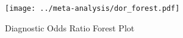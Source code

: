 \begin{figure}[p]


\texttt{[image: ../meta-analysis/dor\_forest.pdf]}

\caption[Diagnostic Odds Ratio Forest Plot]{Diagnostic Odds Ratio Forest Plot}
\label{fig:dor_forest}
\end{figure}

